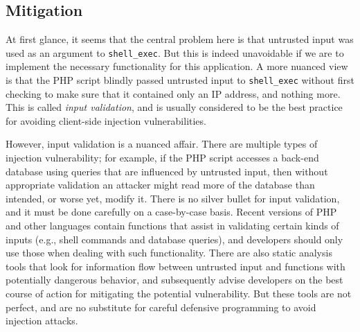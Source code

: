 \documentclass[11pt,twoside]{scrartcl}
\begin{document}
\subsection{Mitigation}
At first glance, it seems that the central problem here is that untrusted input was used as an argument to \verb'shell_exec'. But this is indeed unavoidable if we are to implement the necessary functionality for this application. A more nuanced view is that the PHP script blindly passed untrusted input to \verb'shell_exec' without first checking to make sure that it contained only an IP address, and nothing more. This is called \emph{input validation}, and is usually considered to be the best practice for avoiding client-side injection vulnerabilities. 

However, input validation is a nuanced affair. There are multiple types of injection vulnerability; for example, if the PHP script accesses a back-end database using queries that are influenced by untrusted input, then without appropriate validation an attacker might read more of the database than intended, or worse yet, modify it. There is no silver bullet for input validation, and it must be done carefully on a case-by-case basis. Recent versions of PHP and other languages contain functions that assist in validating certain kinds of inputs (e.g., shell commands and database queries), and developers should only use those when dealing with such functionality. There are also static analysis tools that look for information flow between untrusted input and functions with potentially dangerous behavior, and subsequently advise developers on the best course of action for mitigating the potential vulnerability. But these tools are not perfect, and are no substitute for careful defensive programming to avoid injection attacks.










\end{document}
